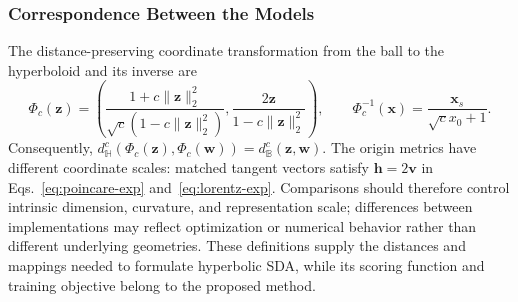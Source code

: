 \subsubsection{Correspondence Between the Models}
The distance-preserving coordinate transformation from the ball to the hyperboloid and its inverse are
\begin{equation}
 \Phi_c(\mathbf{z})=
 \left(\frac{1+c\|\mathbf{z}\|_2^2}{\sqrt c(1-c\|\mathbf{z}\|_2^2)},
 \frac{2\mathbf{z}}{1-c\|\mathbf{z}\|_2^2}\right),
 \qquad
 \Phi_c^{-1}(\mathbf{x})=\frac{\mathbf{x}_s}{\sqrt c x_0+1}.
 \label{eq:hyperbolic-correspondence}
\end{equation}
Consequently, $d_{\mathbb H}^c(\Phi_c(\mathbf{z}),\Phi_c(\mathbf{w}))=d_{\mathbb B}^c(\mathbf{z},\mathbf{w})$. The origin metrics have different coordinate scales: matched tangent vectors satisfy $\mathbf{h}=2\mathbf{v}$ in Eqs.~\ref{eq:poincare-exp} and~\ref{eq:lorentz-exp}. Comparisons should therefore control intrinsic dimension, curvature, and representation scale; differences between implementations may reflect optimization or numerical behavior rather than different underlying geometries. These definitions supply the distances and mappings needed to formulate hyperbolic SDA, while its scoring function and training objective belong to the proposed method.
